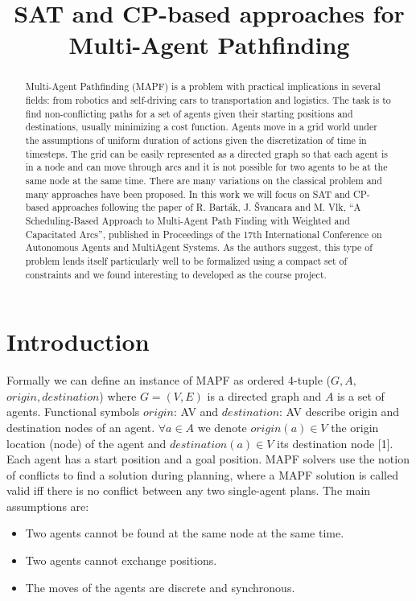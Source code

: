 \documentclass[12pt, a4paper, hidelinks]{article}
\numberwithin{equation}{section}
\begin{document}
\title{SAT and CP-based approaches for Multi-Agent Pathfinding}
\maketitle

\begin{abstract}
Multi-Agent Pathfinding (MAPF) is a problem with practical implications in several fields: from robotics and self-driving cars to transportation and logistics.
The task is to find non-conflicting paths for a set of agents given their starting positions and destinations, usually minimizing a cost function.
Agents move in a grid world under the assumptions of uniform duration of actions given the discretization of time in timesteps.
The grid can be easily represented as a directed graph so that each agent is in a node and can move through arcs and it is not possible for two agents to be at the same node at the same time.
There are many variations on the classical problem and many approaches have been proposed.
In this work we will focus on SAT and CP-based approaches following the paper of R. Barták, J. Švancara and M. Vlk, ``A Scheduling-Based Approach to Multi-Agent Path Finding with Weighted and Capacitated Arcs'', published in Proceedings of the 17th International Conference on Autonomous Agents and MultiAgent Systems.
As the authors suggest, this type of problem lends itself particularly well to be formalized using a compact set of constraints and we found interesting to developed as the course project.
\end{abstract}

\section{Introduction}\label{sec:introduction}
Formally we can define an instance of MAPF as ordered 4-tuple ($G, A,$ $origin, destination$) where $G = (V, E)$ is a directed graph and $A$ is a set of agents.
Functional symbols $origin$: A\textrightarrow V and $destination$: A\textrightarrow V describe origin and destination nodes of an agent. $\forall a\in A$ we denote $origin(a)\in V$ the origin location (node) of the agent and $destination(a)\in V$ its destination node [1].
Each agent has a start position and a goal position.
MAPF solvers use the notion of conflicts to find a solution during planning, where a MAPF solution is called valid iff there is no conflict between any two single-agent plans.
The main assumptions are:

\begin{itemize} 
\item Two agents cannot be found at the same node at the same time.
\item Two agents cannot exchange positions.
\item The moves of the agents are discrete and synchronous.
\end{itemize}
\end{document}
